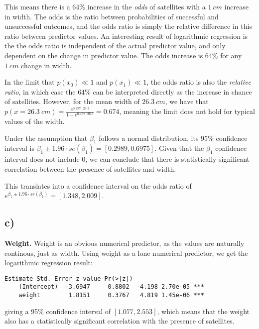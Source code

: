 \documentclass[a4paper, twocolumn]{article}
\renewcommand{\exp}{e^}
\begin{document}
This means there is a $64\%$ increase in the \textit{odds} of satellites with a $\SI{1}{cm}$ increase in width. The odds is the ratio between probabilities of successful and unsuccessful outcomes, and the odds ratio is simply the relative difference in this ratio between predictor values. An interesting result of logarithmic regression is the the odds ratio is independent of the actual predictor value, and only dependent on the change in predictor value. The odds increase is $64\%$ for any $\SI{1}{cm}$ change in width.

In the limit that $p(x_0) \ll 1$ and $p(x_1) \ll 1$, the odds ratio is also the \textit{relative ratio}, in which case the $64\%$ can be interpreted directly as the increase in chance of satellites. However, for the mean width of $\SI{26.3}{cm}$, we have that $p(x = \SI{26.3}{cm}) = \frac{\exp{0.497\cdot 26.3}}{1 - \exp{0.497\cdot 26.3}} = 0.674$, meaning the limit does not hold for typical values of the width.

Under the assumption that $\beta_1$ follows a normal distribution, its 95\% confidence interval is $\beta_1 \pm 1.96\cdot se(\beta_1) = [0.2989, 0.6975]$. Given  that the $\beta_1$ confidence interval does not include 0, we can conclude that there is statistically significant correlation between the presence of satellites and width.

This translates into a confidence interval on the odds ratio of $\exp{\beta_1 \pm 1.96\cdot se(\beta_1)} = [1.348, 2.009]$.

\subsection*{c)}
\textbf{Weight.} Weight is an obvious numerical predictor, as the values are naturally continous, just as width. Using weight as a lone numerical predictor, we get the logarithmic regression result:
\begin{Verbatim}[fontsize=\scriptsize]
                Estimate Std. Error z value Pr(>|z|)    
    (Intercept)  -3.6947     0.8802  -4.198 2.70e-05 ***
    weight        1.8151     0.3767   4.819 1.45e-06 ***
\end{Verbatim}
giving a 95\% confidence interval of $[1.077, 2.553]$, which means that the weight also has a statistically significant correlation with the presence of satellites.
\end{document}
